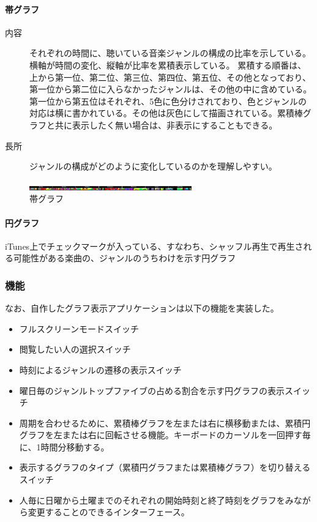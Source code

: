 \documentclass[11pt, twocolumn]{jsarticle}
\begin{document}
\paragraph{帯グラフ}
\begin{description}
\item[内容]
それぞれの時間に、聴いている音楽ジャンルの構成の比率を示している。横軸が時間の変化、縦軸が比率を累積表示している。
累積する順番は、上から第一位、第二位、第三位、第四位、第五位、その他となっており、第一位から第二位に入らなかったジャンルは、その他の中に含めている。第一位から第五位はそれぞれ、5色に色分けされており、色とジャンルの対応は横に書かれている。その他は灰色にして描画されている。累積棒グラフと共に表示したく無い場合は、非表示にすることもできる。
\item[長所]
ジャンルの構成がどのように変化しているのかを理解しやすい。
\end{description}





\begin{figure}[htbp]
\begin{center}
\includegraphics[width=7cm]{beltGraph.jpg}
\caption{帯グラフ}
\end{center}
\end{figure}

\paragraph{円グラフ}
\begin{description}
\item
iTunes上でチェックマークが入っている、すなわち、シャッフル再生で再生される可能性がある楽曲の、ジャンルのうちわけを示す円グラフ
\end{description}


\subsubsection{機能}
なお、自作したグラフ表示アプリケーションは以下の機能を実装した。
\begin{itemize}
\item
フルスクリーンモードスイッチ
\item
閲覧したい人の選択スイッチ
\item
時刻によるジャンルの遷移の表示スイッチ
\item
曜日毎のジャンルトップファイブの占める割合を示す円グラフの表示スイッチ
\item
周期を合わせるために、累積棒グラフを左または右に横移動または、累積円グラフを左または右に回転させる機能。キーボードのカーソルを一回押す毎に、1時間分移動する。
\item
表示するグラフのタイプ（累積円グラフまたは累積棒グラフ）を切り替えるスイッチ
\item
人毎に日曜から土曜までのそれぞれの開始時刻と終了時刻をグラフをみながら変更することのできるインターフェース。
\end{itemize}
\end{document}
